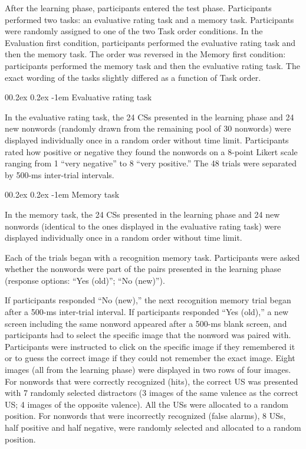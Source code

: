 \documentclass[
  man,floatsintext]{apa6}
\makeatletter
\let\oldparagraph\paragraph
\renewcommand{\paragraph}[1]{\oldparagraph{#1}\mbox{}}
\renewcommand{\paragraph}{\@startsection{paragraph}{4}{\parindent}%
  {0\baselineskip \@plus 0.2ex \@minus 0.2ex}%
  {-1em}%
  {\normalfont\normalsize\bfseries\itshape\typesectitle}}
\makeatother
\begin{document}
After the learning phase, participants entered the test phase. Participants performed two tasks: an evaluative rating task and a memory task. Participants were randomly assigned to one of the two Task order conditions. In the Evaluation first condition, participants performed the evaluative rating task and then the memory task. The order was reversed in the Memory first condition: participants performed the memory task and then the evaluative rating task. The exact wording of the tasks slightly differed as a function of Task order.

\hypertarget{evaluative-rating-task}{%
\paragraph{Evaluative rating task}\label{evaluative-rating-task}}

In the evaluative rating task, the 24 CSs presented in the learning phase and 24 new nonwords (randomly drawn from the remaining pool of 30 nonwords) were displayed individually once in a random order without time limit. Participants rated how positive or negative they found the nonwords on a 8-point Likert scale ranging from 1 ``very negative'' to 8 ``very positive.'' The 48 trials were separated by 500-ms inter-trial intervals.

\hypertarget{memory-task}{%
\paragraph{Memory task}\label{memory-task}}

In the memory task, the 24 CSs presented in the learning phase and 24 new nonwords (identical to the ones displayed in the evaluative rating task) were displayed individually once in a random order without time limit.

Each of the trials began with a recognition memory task. Participants were asked whether the nonwords were part of the pairs presented in the learning phase (response options: ``Yes (old)''; ``No (new)'').

If participants responded ``No (new),'' the next recognition memory trial began after a 500-ms inter-trial interval. If participants responded ``Yes (old),'' a new screen including the same nonword appeared after a 500-ms blank screen, and participants had to select the specific image that the nonword was paired with. Participants were instructed to click on the specific image if they remembered it or to guess the correct image if they could not remember the exact image. Eight images (all from the learning phase) were displayed in two rows of four images. For nonwords that were correctly recognized (hits), the correct US was presented with 7 randomly selected distractors (3 images of the same valence as the correct US; 4 images of the opposite valence). All the USs were allocated to a random position. For nonwords that were incorrectly recognized (false alarms), 8 USs, half positive and half negative, were randomly selected and allocated to a random position.
\end{document}
